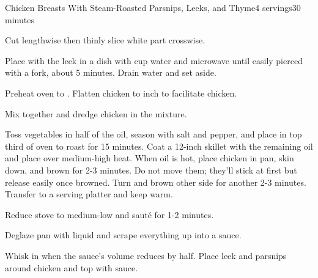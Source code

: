 \documentclass[../Cookbook.tex]{subfiles}
\begin{document}
\begin{recipe}{Chicken Breasts With Steam-Roasted Parsnips, Leeks, and Thyme}{4 servings}{30 minutes}

Cut lengthwise then thinly slice white part crosswise.

Place with the leek in a dish with  cup water and microwave until easily pierced with a fork, about 5 minutes. Drain water and set aside.

Preheat oven to . Flatten chicken to  inch to facilitate chicken.

Mix together and dredge chicken in the mixture.

Toss vegetables in half of the oil, season with salt and pepper, and place in top third of oven to roast for 15 minutes.
Coat a 12-inch skillet with the remaining oil and place over medium-high heat. When oil is hot, place chicken in pan, skin down, and brown for 2-3 minutes. Do not move them; they'll stick at first but release easily once browned. Turn and brown other side for another 2-3 minutes. Transfer to a serving platter and keep warm.

Reduce stove to medium-low and saut\'e for 1-2 minutes.

Deglaze pan with liquid and scrape everything up into a sauce.

Whisk in when the sauce's volume reduces by half. Place leek and parsnips around chicken and top with sauce.

\end{recipe}
\end{document}
